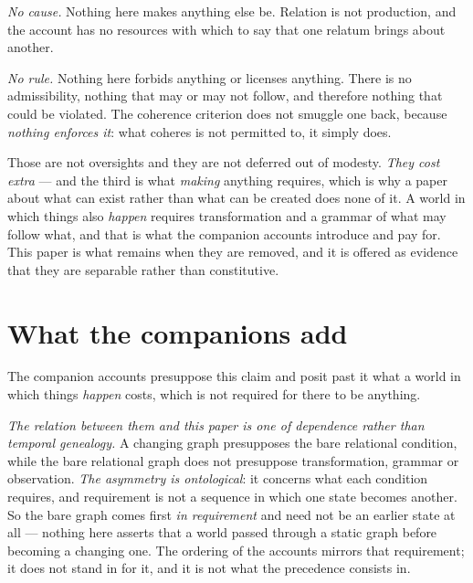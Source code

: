 \documentclass[11pt,a4paper]{article}
\begin{document}
\emph{No cause.} Nothing here makes anything else be. Relation is not production, and the account has no
resources with which to say that one relatum brings about another.

\emph{No rule.} Nothing here forbids anything or licenses anything. There is no admissibility, nothing
that may or may not follow, and therefore nothing that could be violated. The coherence criterion does
not smuggle one back, because \emph{nothing enforces it}: what coheres is not permitted to, it simply
does.

Those are not oversights and they are not deferred out of modesty. \emph{They cost extra} --- and the third is what \emph{making} anything requires, which is why a paper
about what can exist rather than what can be created does none of it. A world
in which things also \emph{happen} requires transformation and a grammar of what may follow what, and
that is what the companion accounts introduce and pay for. This paper is what remains when they are
removed, and it is offered as evidence that they are separable rather than constitutive.

\section{What the companions add}\label{sec:companions}
The companion accounts presuppose this claim and posit past it what a world in which things
\emph{happen} costs, which is not required for there to be anything.

\emph{The relation between them and this paper is one of dependence rather than temporal genealogy.}
A changing graph presupposes the bare relational condition, while the bare relational graph does not
presuppose transformation, grammar or observation. \emph{The asymmetry is ontological}: it concerns
what each condition requires, and requirement is not a sequence in which one state becomes another. So
the bare graph comes first \emph{in requirement} and need not be an earlier state at all --- nothing
here asserts that a world passed through a static graph before becoming a changing one. The ordering of
the accounts mirrors that requirement; it does not stand in for it, and it is not what the precedence
consists in.
\end{document}

